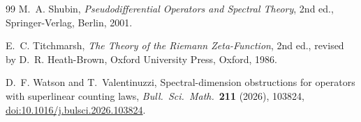 \documentclass[12pt]{amsart}
\begin{document}
{\begin{thebibliography}{99}
M.~A. Shubin,
\emph{Pseudodifferential Operators and Spectral Theory},
2nd ed., Springer-Verlag, Berlin, 2001.

E.~C. Titchmarsh,
\emph{The Theory of the Riemann Zeta-Function},
2nd ed., revised by D.~R. Heath-Brown,
Oxford University Press, Oxford, 1986.

D.~F. Watson and T.~Valentinuzzi,
Spectral-dimension obstructions for operators with superlinear
counting laws,
\emph{Bull.\ Sci.\ Math.}\ \textbf{211} (2026), 103824,
\href{https://doi.org/10.1016/j.bulsci.2026.103824}{doi:10.1016/j.bulsci.2026.103824}.

\end{thebibliography}
}
\end{document}
